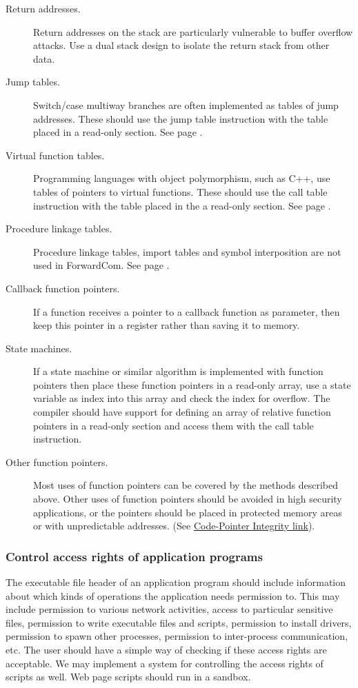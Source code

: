 \documentclass[forwardcom.tex]{subfiles}
\begin{document}
\begin{description}
\item[Return addresses.] Return addresses on the stack are particularly vulnerable to buffer overflow attacks. Use a dual stack design to isolate the return stack from other data.

\item[Jump tables.] Switch/case multiway branches are often implemented as tables of jump addresses. These should use the jump table instruction with the table placed in a read-only section. See page \pageref{jumpTableInstruction}.

\item[Virtual function tables.] Programming languages with object polymorphism, such as C++, use tables of pointers to virtual functions. These should use the call table instruction with the table placed in the a read-only section. See page \pageref{jumpTableInstruction}.

\item[Procedure linkage tables.] Procedure linkage tables, import tables and symbol interposition are not used in ForwardCom. See page \pageref{libraryLinkMethods}.

\item[Callback function pointers.] If a function receives a pointer to a callback function as parameter, then keep this pointer in a register rather than saving it to memory.

\item[State machines.] If a state machine or similar algorithm is implemented with function pointers then place these function pointers in a read-only array, use a state variable as index into this array and check the index for overflow. The compiler should have support for defining an array of relative function pointers in a read-only section and access them with the call table instruction.

\item[Other function pointers.] Most uses of function pointers can be covered by the methods described above. Other uses of function pointers should be avoided in high security applications, or the pointers should be placed in protected memory areas or with unpredictable addresses. (See
\href{http://dslab.epfl.ch/proj/cpi/}{Code-Pointer Integrity link}).

\end{description}

\subsubsection{Control access rights of application programs} 
The executable file header of an application program should include information about which kinds of operations the application needs permission to. This may include permission to various network activities, access to particular sensitive files, permission to write executable files and scripts, permission to install drivers, permission to spawn other processes, permission to inter-process communication, etc. The user should have a simple way of checking if these access rights are acceptable. We may implement a system for controlling the access rights of scripts as well. Web page scripts should run in a sandbox.
\end{document}
